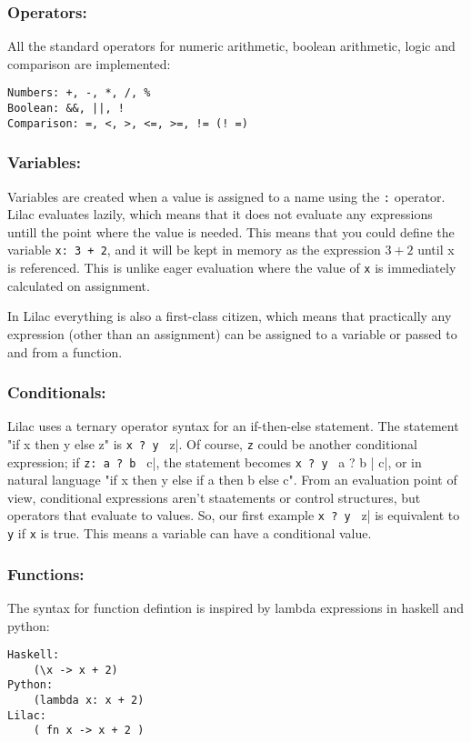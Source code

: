 \documentclass[a4paper, 11pt]{report}
\begin{document}
\subsubsection{Operators:}
All the standard operators for numeric arithmetic, boolean arithmetic, logic and comparison are implemented:\\
\begin{verbatim}
Numbers: +, -, *, /, %
Boolean: &&, ||, !
Comparison: =, <, >, <=, >=, != (! =)
\end{verbatim}

\subsubsection{Variables:}
Variables are created when a value is assigned to a name using the \verb|:| operator. Lilac evaluates lazily, which means that it does not evaluate any expressions untill the point where the value is needed. This means that you could define the variable \verb|x: 3 + 2|, and it will be kept in memory as the expression $3+2$ until x is referenced. This is unlike eager evaluation where the value of \verb|x| is immediately calculated on assignment.

In Lilac everything is also a first-class citizen, which means that practically any expression (other than an assignment) can be assigned to a variable or passed to and from a function.

\subsubsection{Conditionals:}
Lilac uses a ternary operator syntax for an if-then-else statement. The statement "if x then y else z" is \verb|x ? y | z|. Of course, \verb|z| could be another conditional expression; if \verb|z: a ? b | c|, the statement becomes \verb|x ? y | a ? b | c|, or in natural language "if x then y else if a then b else c". From an evaluation point of view, conditional expressions aren't staatements or control structures, but operators that evaluate to values. So, our first example \verb|x ? y | z| is equivalent to \verb|y| if \verb|x| is true. This means a variable can have a conditional value.

\subsubsection{Functions:}
The syntax for function defintion is inspired by lambda expressions in haskell and python:\\
\begin{verbatim}
Haskell:
	(\x -> x + 2)
Python:
	(lambda x: x + 2)
Lilac:
	( fn x -> x + 2 )
\end{verbatim}
\end{document}
